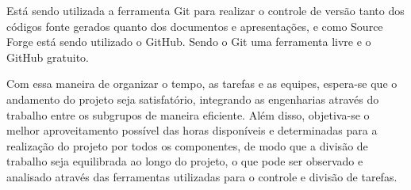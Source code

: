 Está sendo utilizada a ferramenta Git para realizar o controle de versão tanto dos códigos fonte gerados quanto dos documentos e apresentações, e como Source
Forge está sendo utilizado o GitHub. Sendo o Git uma ferramenta livre e o GitHub gratuito.

Com essa maneira de organizar o tempo, as tarefas e as equipes, espera-se que o andamento do projeto seja satisfatório, integrando as engenharias através do 
trabalho entre os subgrupos de maneira eficiente. Além disso, objetiva-se o melhor aproveitamento possível das horas disponíveis e determinadas para a realização 
do projeto por todos os componentes, de modo que a divisão de trabalho seja equilibrada ao longo do projeto, o que pode ser observado e analisado através das 
ferramentas utilizadas para o controle e divisão de tarefas.


